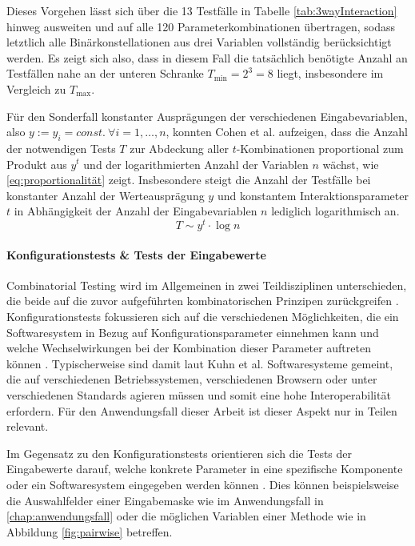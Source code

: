 Dieses Vorgehen lässt sich über die 13 Testfälle in Tabelle \ref{tab:3wayInteraction} hinweg ausweiten und auf alle 120 Parameterkombinationen übertragen, sodass letztlich alle Binärkonstellationen aus drei Variablen vollständig berücksichtigt werden. Es zeigt sich also, dass in diesem Fall die tatsächlich benötigte Anzahl an Testfällen nahe an der unteren Schranke $T_{\min} = 2^3 = 8$ liegt, insbesondere im Vergleich zu $T_{\max}$.

Für den Sonderfall konstanter Ausprägungen der verschiedenen Eingabevariablen, also $y := y_i = const. ~ \forall i = 1,\dots,n$, konnten Cohen et al. \cite{cohen1997aetg} aufzeigen, dass die Anzahl der notwendigen Tests $T$ zur Abdeckung aller $t$-Kombinationen proportional zum Produkt aus $y^t$ und der logarithmierten Anzahl der Variablen $n$ wächst, wie \autoref{eq:proportionalität} zeigt. Insbesondere steigt die Anzahl der Testfälle bei konstanter Anzahl der Werteausprägung $y$ und konstantem Interaktionsparameter $t$ in Abhängigkeit der Anzahl der Eingabevariablen $n$ lediglich logarithmisch an.
\begin{equation}\label{eq:proportionalität}
T \sim y^t \cdot \log n
\end{equation}



\paragraph{Konfigurationstests \& Tests der Eingabewerte}

Combinatorial Testing wird im Allgemeinen in zwei Teildisziplinen unterschieden, die beide auf die zuvor aufgeführten kombinatorischen Prinzipen zurückgreifen \cite{kuhn2010practical}. Konfigurationstests fokussieren sich auf die verschiedenen Möglichkeiten, die ein Softwaresystem in Bezug auf Konfigurationsparameter einnehmen kann und welche Wechselwirkungen bei der Kombination dieser Parameter auftreten können \cite{kuhn2010practical}. Typischerweise sind damit laut Kuhn et al. \cite{kuhn2010practical} Softwaresysteme gemeint, die auf verschiedenen Betriebssystemen, verschiedenen Browsern oder unter verschiedenen Standards agieren müssen und somit eine hohe Interoperabilität erfordern. Für den Anwendungsfall dieser Arbeit ist dieser Aspekt nur in Teilen relevant.

Im Gegensatz zu den Konfigurationstests orientieren sich die Tests der Eingabewerte darauf, welche konkrete Parameter in eine spezifische Komponente oder ein Softwaresystem eingegeben werden können \cite{kuhn2010practical}. Dies können beispielsweise die Auswahlfelder einer Eingabemaske wie im Anwendungsfall in \autoref{chap:anwendungsfall} oder die möglichen Variablen einer Methode wie in Abbildung \ref{fig:pairwise} betreffen. 


